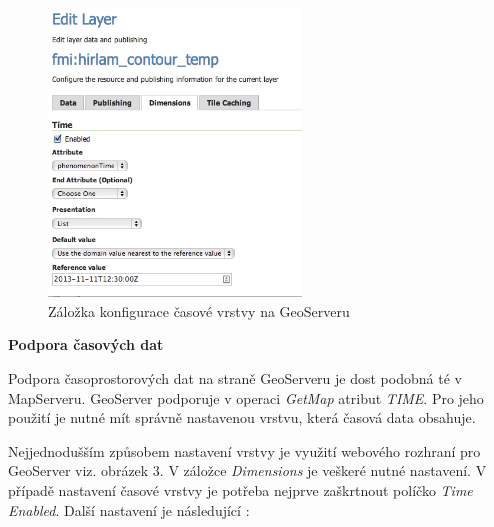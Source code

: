 \begin{figure}[h!]  \centering
\includegraphics[width=0.6\textwidth]{../img/geoserver-layer-edit.png}
	\caption{Záložka konfigurace časové vrstvy na GeoServeru
\cite{geoserver-layer-edit}}
	\label{fig:geoserver-layer-edit}
\end{figure}

\bigskip
\noindent

\textbf{Podpora časových dat}

Podpora časoprostorových dat na straně GeoServeru je dost podobná té v
MapServeru. GeoServer podporuje v operaci \textit{GetMap} atribut
\textit{TIME}. Pro jeho použití je nutné mít správně nastavenou
vrstvu, která časová data obsahuje.

Nejjednodušším způsobem nastavení vrstvy je využití webového rozhraní
pro Geo\-Server viz. obrázek 3. V záložce \textit{Dimensions} je veškeré
nutné nastavení. V případě nastavení časové vrstvy je potřeba nejprve
zaškrtnout políčko \textit{Time Enabled}. Další nastavení je
následující \cite{geoserver-layer-edit}:

